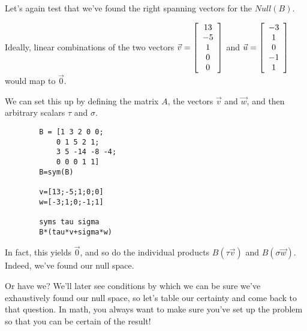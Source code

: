 \documentclass{ximera}
\begin{document}
\begin{problem}

    Let's again test that we've found the right spanning vectors for the $Null(B)$.

    Ideally, linear combinations of the two vectors $\vec{v}=\startmat{c}13\\-5\\1\\0\\0\stopmat$ and $\vec{u}=\startmat{c}-3\\1\\0\\-1\\1\stopmat$ would map to $\vec{0}$.

    We can set this up by defining the matrix $A$, the vectors $\vec{v}$ and $\vec{w}$, and then arbitrary scalars $\tau$ and $\sigma$.

    \begin{verbatim}
        B = [1 3 2 0 0; 
            0 1 5 2 1; 
            3 5 -14 -8 -4; 
            0 0 0 1 1]
        B=sym(B)

        v=[13;-5;1;0;0]
        w=[-3;1;0;-1;1]

        syms tau sigma
        B*(tau*v+sigma*w)
    \end{verbatim}

    In fact, this yields $\vec{0}$, and so do the individual products $B\left(\tau \vec{v}\right)$ and $B\left(\sigma\vec{w}\right)$. Indeed, we've found our null space. 

    Or have we? We'll later see conditions by which we can be sure we've exhaustively found our null space, so let's table our certainty and come back to that question. In math, you always want to make sure you've set up the problem so that you can be certain of the result!

\end{problem}
\end{document}

